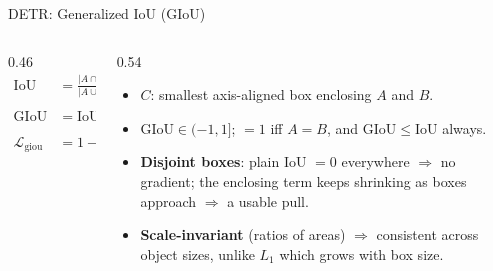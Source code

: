 \begin{frame}{DETR: Generalized IoU (GIoU)}
  \vspace{0.2em}
  \begin{columns}[T]
    \begin{column}{0.46\textwidth}
      \begin{align*}
        \mathrm{IoU}  &= \frac{|A\cap B|}{|A\cup B|} \\[2pt]
        \mathrm{GIoU} &= \mathrm{IoU} - \frac{|C\setminus(A\cup B)|}{|C|} \\[2pt]
        \mathcal{L}_\text{giou} &= 1 - \mathrm{GIoU} \;\in\; [0,2)
      \end{align*}
    \end{column}
    \begin{column}{0.54\textwidth}
      \begin{itemize}\itemsep2pt
        \item $C$: smallest axis-aligned box enclosing $A$ and $B$.
        \item $\mathrm{GIoU}\in(-1,1]$; $=1$ iff $A{=}B$, and $\mathrm{GIoU}\le\mathrm{IoU}$ always.
        \item \textbf{Disjoint boxes}: plain IoU $=0$ everywhere $\Rightarrow$ no gradient; the enclosing term keeps shrinking as boxes approach $\Rightarrow$ a usable pull.
        \item \textbf{Scale-invariant} (ratios of areas) $\Rightarrow$ consistent across object sizes, unlike $L_1$ which grows with box size.
      \end{itemize}
    \end{column}
  \end{columns}
\end{frame}

